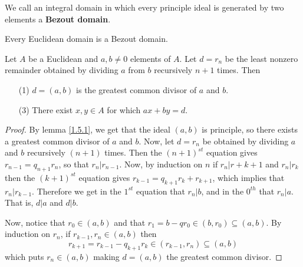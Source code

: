 \begin{definition}
    We call an integral domain in which every principle ideal is generated by
    two elements a \textbf{Bezout domain}.
\end{definition}

\begin{lemma}\label{1.5.5}
    Every Euclidean domain is a Bezout domain.
\end{lemma}

\begin{theorem}\label{1.5.6}
    Let $A$ be a Euclidean and $a,b \neq 0$ elements of  $A$. Let  $d=r_n$ be
    the least nonzero remainder obtained by dividing $a$ from $b$ recursively
    $n+1$ times. Then
    \begin{enumerate}
        \item[(1)] $d=(a,b)$ is the greatest common divisor of $a$ and  $b$.

        \item[(3)] There exist $x,y \in A$ for which  $ax+by=d$.
    \end{enumerate}
\end{theorem}
\begin{proof}
    By lemma \ref{1.5.1}, we get that the ideal $(a,b)$ is principle, so there
    exists a greatest common divisor of $a$ and  $b$. Now, let  $d=r_n$ be
    obtained by dividing $a$ and $b$ recursively $(n+1)$ times. Then the
    $(n+1)^{st}$ equation gives $r_{n-1}=q_{n+1}r_n$, so that $r_n|r_{n-1}$.
    Now, by induction on $n$ if  $r_n|r+{k+1}$ and $r_n|r_k$ then the
    $(k+1)^{st}$ equation gives $r_{k-1}=q_{k+1}r_k+r_{k+1}$, which implies that
    $r_n|r_{k-1}$. Therefore we get in the $1^{st}$ equation that $r_n|b$, and in
    the $0^{th}$ that $r_n|a$. That is,  $d|a$ and  $d|b$.

    Now, notice that $r_0 \in (a,b)$ and that $r_1=b-qr_0 \in (b,r_0) \subseteq
    (a,b)$. By induction on $r_n$, if  $r_{k-1},r_n \in (a,b)$ then
    \begin{equation*}
        r_{k+1}=r_{k-1}-q_{k+1}r_k \in (r_{k-1},r_n) \subseteq (a,b)
    \end{equation*}
    which puts $r_n \in (a,b)$ making $d=(a,b)$ the greatest common divisor.
\end{proof}
